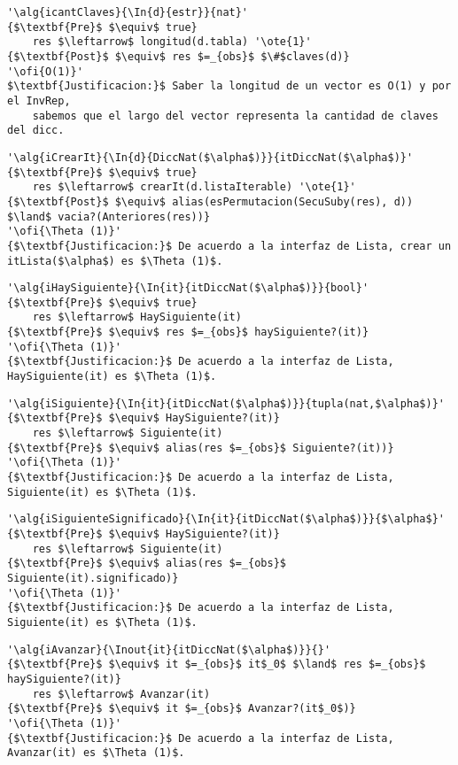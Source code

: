 \begin{lstlisting}[mathescape]
'\alg{icantClaves}{\In{d}{estr}}{nat}'
{$\textbf{Pre}$ $\equiv$ true}
	res $\leftarrow$ longitud(d.tabla) '\ote{1}'
{$\textbf{Post}$ $\equiv$ res $=_{obs}$ $\#$claves(d)}
'\ofi{O(1)}'
$\textbf{Justificacion:}$ Saber la longitud de un vector es O(1) y por el InvRep,
	sabemos que el largo del vector representa la cantidad de claves del dicc.
\end{lstlisting}

\begin{lstlisting}[mathescape]
'\alg{iCrearIt}{\In{d}{DiccNat($\alpha$)}}{itDiccNat($\alpha$)}'
{$\textbf{Pre}$ $\equiv$ true}
	res $\leftarrow$ crearIt(d.listaIterable) '\ote{1}'
{$\textbf{Post}$ $\equiv$ alias(esPermutacion(SecuSuby(res), d)) $\land$ vacia?(Anteriores(res))}
'\ofi{\Theta (1)}'
{$\textbf{Justificacion:}$ De acuerdo a la interfaz de Lista, crear un itLista($\alpha$) es $\Theta (1)$.
\end{lstlisting}

\begin{lstlisting}[mathescape]
'\alg{iHaySiguiente}{\In{it}{itDiccNat($\alpha$)}}{bool}'
{$\textbf{Pre}$ $\equiv$ true}
	res $\leftarrow$ HaySiguiente(it)
{$\textbf{Pre}$ $\equiv$ res $=_{obs}$ haySiguiente?(it)}
'\ofi{\Theta (1)}'
{$\textbf{Justificacion:}$ De acuerdo a la interfaz de Lista, HaySiguiente(it) es $\Theta (1)$.
\end{lstlisting}

\begin{lstlisting}[mathescape]
'\alg{iSiguiente}{\In{it}{itDiccNat($\alpha$)}}{tupla(nat,$\alpha$)}'
{$\textbf{Pre}$ $\equiv$ HaySiguiente?(it)}
	res $\leftarrow$ Siguiente(it)
{$\textbf{Pre}$ $\equiv$ alias(res $=_{obs}$ Siguiente?(it))}
'\ofi{\Theta (1)}'
{$\textbf{Justificacion:}$ De acuerdo a la interfaz de Lista, Siguiente(it) es $\Theta (1)$.
\end{lstlisting}

\begin{lstlisting}[mathescape]
'\alg{iSiguienteSignificado}{\In{it}{itDiccNat($\alpha$)}}{$\alpha$}'
{$\textbf{Pre}$ $\equiv$ HaySiguiente?(it)}
	res $\leftarrow$ Siguiente(it)
{$\textbf{Pre}$ $\equiv$ alias(res $=_{obs}$ Siguiente(it).significado)}
'\ofi{\Theta (1)}'
{$\textbf{Justificacion:}$ De acuerdo a la interfaz de Lista, Siguiente(it) es $\Theta (1)$.
\end{lstlisting}

\begin{lstlisting}[mathescape]
'\alg{iAvanzar}{\Inout{it}{itDiccNat($\alpha$)}}{}'
{$\textbf{Pre}$ $\equiv$ it $=_{obs}$ it$_0$ $\land$ res $=_{obs}$ haySiguiente?(it)}
	res $\leftarrow$ Avanzar(it)
{$\textbf{Pre}$ $\equiv$ it $=_{obs}$ Avanzar?(it$_0$)}
'\ofi{\Theta (1)}'
{$\textbf{Justificacion:}$ De acuerdo a la interfaz de Lista, Avanzar(it) es $\Theta (1)$.
\end{lstlisting}
